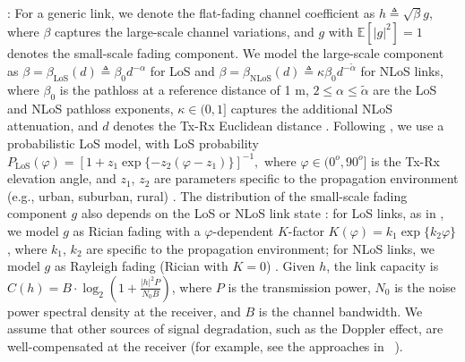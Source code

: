 \documentclass[12pt, draftcls, onecolumn]{IEEEtran}
\theoremstyle{plain}
\theoremstyle{definition}
\theoremstyle{remark}
\begin{document}
: For a generic link, we denote the flat-fading channel coefficient as $h{\triangleq}\sqrt{\beta}g$, where $\beta$ captures the large-scale channel variations, and $g$ with $\mathbb{E}\left[|g|^2\right]{=}1$ denotes the small-scale fading component. We model the large-scale component as $\beta{=}\beta_{\mathrm{LoS}}(d){\triangleq}\beta_{0}d^{-\alpha}$ for LoS and $\beta{=}\beta_{\mathrm{NLoS}}(d){\triangleq}\kappa\beta_{0}d^{-\tilde{\alpha}}$ for NLoS links, where $\beta_{0}$ is the pathloss at a reference distance of 1 m, $2{\leq}\alpha{\leq}\tilde{\alpha}$ are the LoS and NLoS pathloss exponents, $\kappa{\in}(0,1]$ captures the additional NLoS attenuation, and $d$ denotes the Tx-Rx Euclidean distance \cite{SCA}. Following \cite{LAP}, we use a probabilistic LoS model, with LoS probability
$
	P_{\mathrm{LoS}}(\varphi){=}[ 1{+}z_{1}\exp\{-z_{2}(\varphi{-}z_{1})\}]^{-1},
$
where $\varphi{\in}(0^{o},90^{o}]$ is the Tx-Rx elevation angle, and $z_{1}$, $z_{2}$ are parameters specific to the propagation environment (e.g., urban, suburban, rural) \cite{LAP}. The distribution of the small-scale fading component $g$ also depends on the LoS or NLoS link state \cite{WCBook}: for LoS links, as in \cite{Rician}, we model $g$ as Rician fading with a $\varphi$-dependent $K$-factor $K(\varphi){=}k_{1}\exp\{k_{2}\varphi\}$, where  $k_{1}$, $k_{2}$ are specific to the propagation environment; for NLoS links, we model $g$ as Rayleigh fading (Rician with $K{=}0$) \cite{WCBook}. Given $h$, the link capacity is $C(h){=}B{\cdot}\log_{2}\left(1{+}\frac{|h|^{2}P}{N_{0}B}\right)$, where $P$ is the transmission power, $N_{0}$ is the noise power spectral density at the receiver, and $B$ is the channel bandwidth. We assume that other sources of signal degradation, such as the Doppler effect, are well-compensated at the receiver (for example, see the approaches in ~\cite{Doppler}).
\end{document}
